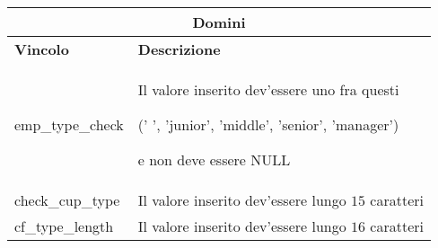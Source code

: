 \begin{tabular}{@{}| p{} | p{} |@{}} %
	\hline
	\multicolumn{2}{|c|}{\textbf{Domini}}                                 \\
	\hline
	\textbf{Vincolo} & \textbf{Descrizione}                               \\
	\hline
	emp\_type\_check & Il valore inserito dev'essere uno fra questi

	(' ', 'junior', 'middle', 'senior', 'manager')

	e non deve essere NULL                                                \\
	\hline
	check\_cup\_type & Il valore inserito dev'essere lungo $15$ caratteri \\
	\hline
	cf\_type\_length & Il valore inserito dev'essere lungo $16$ caratteri \\
	\hline
\end{tabular}

